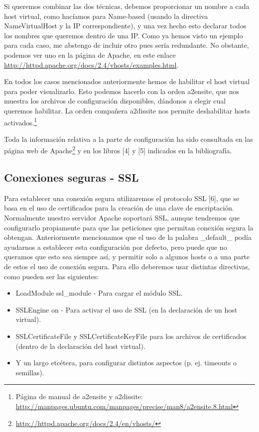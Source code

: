\documentclass[a4paper, 10pt]{article} %
\begin{document}
Si queremos combinar las dos técnicas, debemos proporcionar un nombre a cada host virtual, como hacíamos para Name-based (usando la directiva NameVirtualHost y la IP correspondiente), y una vez hecho esto declarar todos los nombres que queremos dentro de una IP. Como ya hemos visto un ejemplo para cada caso, me abstengo de incluir otro pues sería redundante. No obstante, podemos ver uno en la página de Apache, en este enlace \url{http://httpd.apache.org/docs/2.4/vhosts/examples.html}. 

En todos los casos mencionados anteriormente hemos de habilitar el host virtual para poder visualizarlo. Esto podemos hacerlo con la orden a2ensite, que nos muestra los archivos de configuración disponibles, dándonos a elegir cual queremos habilitar. La orden compañera a2dissite nos permite deshabilitar hosts activados.\footnote{Página de manual de a2ensite y a2dissite: \url{http://manpages.ubuntu.com/manpages/precise/man8/a2ensite.8.html}}

Toda la información relativa a la parte de configuración ha sido consultada en las página web de Apache\footnote{\url{http://httpd.apache.org/docs/2.4/en/vhosts/}} y en los libros [4] y [5] indicados en la bibliografía. 

\subsection{Conexiones seguras - SSL}

Para establecer una conexión segura utilizaremos el protocolo SSL [6], que se basa en el uso de certificados para la creación de una clave de encriptación. Normalmente nuestro servidor Apache soportará SSL, aunque tendremos que configurarlo propiamente para que las peticiones que permitan conexión segura la obtengan. Anteriormente mencionamos que el uso de la palabra \_default\_ podía ayudarnos a establecer esta configuración por defecto, pero puede que no queramos que esto sea siempre así, y permitir solo a algunos hosts o a una parte de estos el uso de conexión segura. Para ello deberemos usar distintas directivas, como pueden ser las siguientes:

\begin{itemize}
\item LoadModule ssl\_module - Para cargar el módulo SSL. 
\item SSLEngine on - Para activar el uso de SSL (en la declaración de un host virtual). 
\item SSLCertificateFile y SSLCertificateKeyFile para los archivos de certificados (dentro de la declaración del host virtual).
\item Y un largo etcétera, para configurar distintos aspectos (p. ej. timeouts o semillas).
\end{itemize}
\end{document}
